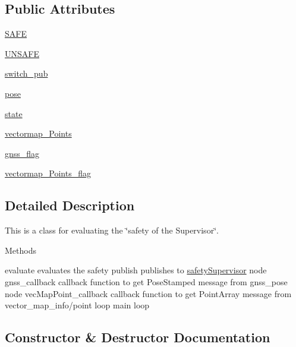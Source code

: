 \subsection*{Public Attributes}
\begin{DoxyCompactItemize}
\item 
\hyperlink{classsafetySupervisor_1_1safetySupervisor_a2311f2bc91e583e05ff77d239e2df06b}{S\+A\+FE}
\item 
\hyperlink{classsafetySupervisor_1_1safetySupervisor_ad0da1483d98160dd7d6e192dfe4d9d81}{U\+N\+S\+A\+FE}
\item 
\hyperlink{classsafetySupervisor_1_1safetySupervisor_a0c2c83b27b8472183f5531474dc0f91c}{switch\+\_\+pub}
\item 
\hyperlink{classsafetySupervisor_1_1safetySupervisor_a8e51022bbd58554900963a0e3ebc55ce}{pose}
\item 
\hyperlink{classsafetySupervisor_1_1safetySupervisor_add3738e771cbfad02e7d76d49037ddd4}{state}
\item 
\hyperlink{classsafetySupervisor_1_1safetySupervisor_a1e91accdfe526c67626085b545bf9eff}{vectormap\+\_\+\+Points}
\item 
\hyperlink{classsafetySupervisor_1_1safetySupervisor_ab72709eeb6752632705f58e5cc717190}{gnss\+\_\+flag}
\item 
\hyperlink{classsafetySupervisor_1_1safetySupervisor_ab1a015515abff5d8d5eaa2d0254b1570}{vectormap\+\_\+\+Points\+\_\+flag}
\end{DoxyCompactItemize}


\subsection{Detailed Description}
This is a class for evaluating the \char`\"{}safety of the Supervisor\char`\"{}. 

\begin{DoxyParagraph}{Methods}

\end{DoxyParagraph}
\begin{DoxyParagraph}{}
evaluate evaluates the safety publish publishes to \hyperlink{classsafetySupervisor_1_1safetySupervisor}{safety\+Supervisor} node gnss\+\_\+callback callback function to get Pose\+Stamped message from gnss\+\_\+pose node vec\+Map\+Point\+\_\+callback callback function to get Point\+Array message from vector\+\_\+map\+\_\+info/point loop main loop 
\end{DoxyParagraph}


\subsection{Constructor \& Destructor Documentation}
\mbox{\label{classsafetySupervisor_1_1safetySupervisor_a410d83f6ced10353411df8dc093b205f}} 
